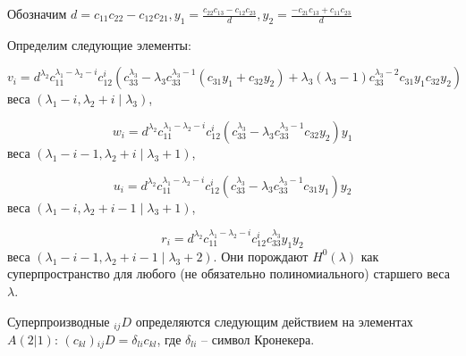 Обозначим $d = c_{11} c_{22} - c_{12} c_{21}, y_1 = \frac{c_{22} c_{13} - c_{12} c_{23}}{d}, y_2 = \frac{-c_{21} c_{13} + c_{11} c_{23}}{d}$

Определим следующие элементы:

$$ v_i = d^{\lambda_2} c_{11}^{\lambda_1 - \lambda_2 - i} c_{12}^i (c_{33}^{\lambda_3} - \lambda_3 c_{33}^{\lambda_3 - 1} (c_{31} y_1 + c_{32} y_2) + \lambda_3 (\lambda_3 - 1) c_{33}^{\lambda_3 - 2} c_{31} y_1 c_{32} y_2) $$ 
веса $(\lambda_1 - i, \lambda_2 + i\mid\lambda_3)$,

$$ w_i = d^{\lambda_2} c_{11}^{\lambda_1 - \lambda_2 - i} c_{12}^i (c_{33}^{\lambda_3} - \lambda_3 c_{33}^{\lambda_3 - 1} c_{32} y_2) y_1 $$ 
веса $(\lambda_1 - i - 1, \lambda_2 + i\mid\lambda_3 + 1)$,

$$ u_i = d^{\lambda_2} c_{11}^{\lambda_1 - \lambda_2 - i} c_{12}^i (c_{33}^{\lambda_3} - \lambda_3 c_{33}^{\lambda_3 - 1} c_{31} y_1) y_2 $$ 
веса $(\lambda_1 - i, \lambda_2 + i - 1\mid\lambda_3 + 1)$,

$$ r_i = d^{\lambda_2} c_{11}^{\lambda_1 - \lambda_2 - i} c_{12}^i c_{33}^{\lambda_3} y_1 y_2 $$ 
веса $(\lambda_1 - i - 1, \lambda_2 + i - 1\mid\lambda_3 + 2)$. Они порождают $H^0 (\lambda)$ как суперпространство для любого (не обязательно полиномиального) старшего веса $\lambda$.

Суперпроизводные $_{ij}D$ определяются следующим действием на элементах $A(2|1)$: $ (c_{kl}) {_{ij}D} = \delta_{li} c_{kl} $, где $\delta_{li}$ -- символ Кронекера.